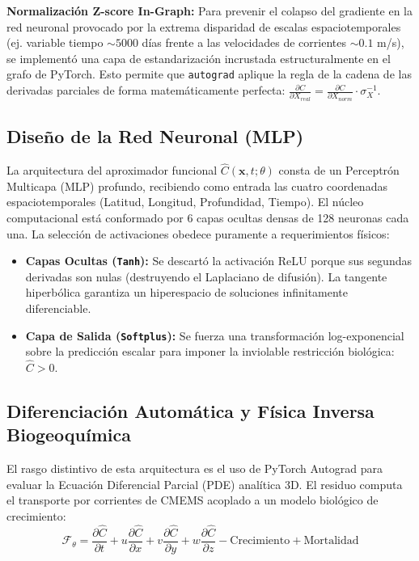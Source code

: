 \documentclass[11pt,a4paper]{article}
\begin{document}
\textbf{Normalización Z-score In-Graph:} Para prevenir el colapso del gradiente en la red neuronal provocado por la extrema disparidad de escalas espaciotemporales (ej. variable tiempo $\sim 5000$ días frente a las velocidades de corrientes $\sim 0.1$ m/s), se implementó una capa de estandarización incrustada estructuralmente en el grafo de PyTorch. Esto permite que \texttt{autograd} aplique la regla de la cadena de las derivadas parciales de forma matemáticamente perfecta: $\frac{\partial C}{\partial X_{real}} = \frac{\partial C}{\partial X_{norm}} \cdot \sigma_X^{-1}$.

\subsection{Diseño de la Red Neuronal (MLP)}
La arquitectura del aproximador funcional $\hat{C}(\mathbf{x}, t; \theta)$ consta de un Perceptrón Multicapa (MLP) profundo, recibiendo como entrada las cuatro coordenadas espaciotemporales (Latitud, Longitud, Profundidad, Tiempo). El núcleo computacional está conformado por 6 capas ocultas densas de 128 neuronas cada una. La selección de activaciones obedece puramente a requerimientos físicos:
\begin{itemize}
    \item \textbf{Capas Ocultas (\texttt{Tanh}):} Se descartó la activación ReLU porque sus segundas derivadas son nulas (destruyendo el Laplaciano de difusión). La tangente hiperbólica garantiza un hiperespacio de soluciones infinitamente diferenciable.
    \item \textbf{Capa de Salida (\texttt{Softplus}):} Se fuerza una transformación log-exponencial sobre la predicción escalar para imponer la inviolable restricción biológica: $\hat{C} > 0$.
\end{itemize}

\subsection{Diferenciación Automática y Física Inversa Biogeoquímica}
El rasgo distintivo de esta arquitectura es el uso de PyTorch Autograd para evaluar la Ecuación Diferencial Parcial (PDE) analítica 3D. El residuo computa el transporte por corrientes de CMEMS acoplado a un modelo biológico de crecimiento:
\begin{equation}
\mathcal{F}_\theta = \frac{\partial \hat{C}}{\partial t} + u \frac{\partial \hat{C}}{\partial x} + v \frac{\partial \hat{C}}{\partial y} + w \frac{\partial \hat{C}}{\partial z} - \text{Crecimiento} + \text{Mortalidad}
\end{equation}
\end{document}
